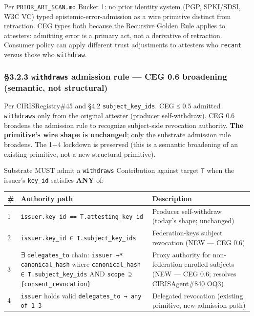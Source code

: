 \documentclass[10pt]{article}
\begin{document}
Per \texttt{PRIOR\_ART\_SCAN.md} Bucket 1: no prior identity system (PGP, SPKI/SDSI, W3C VC) typed epistemic-error-admission as a wire primitive distinct from retraction. CEG types both because the Recursive Golden Rule applies to attesters: admitting error is a primary act, not a derivative of retraction. Consumer policy can apply different trust adjustments to attesters who \texttt{recant} versus those who \texttt{withdraw}.


\subsubsection*{§3.2.3 \texttt{withdraws} admission rule — CEG 0.6 broadening (semantic, not structural)}


Per CIRISRegistry\#45 and §4.2 \texttt{subject\_key\_ids}. CEG ≤ 0.5 admitted \texttt{withdraws} only from the original attester (producer self-withdraw). CEG 0.6 broadens the admission rule to recognize subject-side revocation authority. \textbf{The primitive's wire shape is unchanged}; only the substrate admission rule broadens. The 1+4 lockdown is preserved (this is a semantic broadening of an existing primitive, not a new structural primitive).


Substrate MUST admit a \texttt{withdraws} Contribution against target \texttt{T} when the issuer's \texttt{key\_id} satisfies \textbf{ANY} of:


{\footnotesize
\begin{longtable}{|p{5.33cm}|p{5.33cm}|p{5.33cm}|}\hline
\textbf{\#} & \textbf{Authority path} & \textbf{Description} \\ \hline\endhead
1 & \texttt{issuer.key\_id == T.attesting\_key\_id} & Producer self-withdraw (today's shape; unchanged) \\ \hline
2 & \texttt{issuer.key\_id ∈ T.subject\_key\_ids} & Federation-keys subject revocation (NEW — CEG 0.6) \\ \hline
3 & ∃ \texttt{delegates\_to} chain: \texttt{issuer →* canonical\_hash} where \texttt{canonical\_hash ∈ T.subject\_key\_ids} AND \texttt{scope ⊇ \{consent\_revocation\}} & Proxy authority for non-federation-enrolled subjects (NEW — CEG 0.6; resolves CIRISAgent\#840 OQ3) \\ \hline
4 & \texttt{issuer} holds valid \texttt{delegates\_to → any of 1-3} & Delegated revocation (existing primitive, new admission path) \\ \hline
\end{longtable}}
\end{document}
